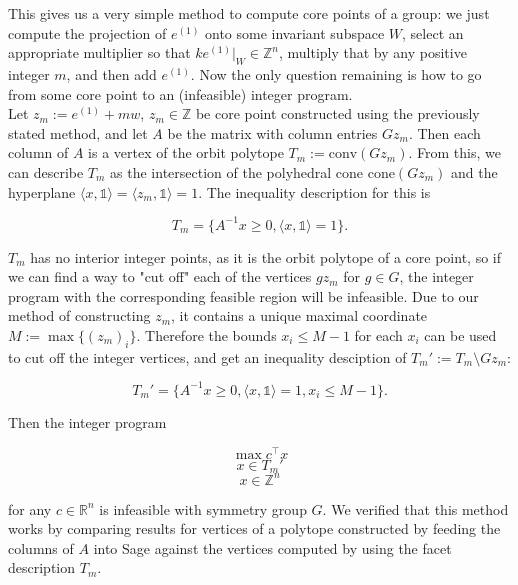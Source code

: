 \documentclass[11pt]{article} %
\theoremstyle{definition}
\theoremstyle{remark}
\newcommand{\ZZ}{\mathbb{Z}}
\newcommand{\RR}{\mathbb{R}}
\begin{document}
This gives us a very simple method to compute core points of a group: we just compute the projection of $e^{(1)}$ onto some invariant subspace $W$, select an appropriate multiplier so that $ke^{(1)}|_W \in \ZZ^n$, multiply that by any positive integer $m$, and then add $e^{(1)}$. Now the only question remaining is how to go from some core point to an (infeasible) integer program.\\

Let $z_m := e^{(1)} + mw$, $z_m \in \ZZ$ be core point constructed using the previously stated method, and let $A$ be the matrix with column entries $Gz_m$. Then each column of $A$ is a vertex of the orbit polytope $T_m := \textrm{conv}(Gz_m)$. From this, we can describe $T_m$ as the intersection of the polyhedral cone $\textrm{cone}(Gz_m)$ and the hyperplane $\langle x,\mathds{1} \rangle = \langle z_m, \mathds{1} \rangle = 1$. The inequality description for this is

\[ T_m = \lbrace A^{-1}x \geq 0, \langle x,\mathds{1} \rangle = 1 \rbrace .\]

$T_m$ has no interior integer points, as it is the orbit polytope of a core point, so if we can find a way to "cut off" each of the vertices $gz_m$ for $g \in G$, the integer program with the corresponding feasible region will be infeasible. Due to our method of constructing $z_m$, it contains a unique maximal coordinate $M := \max \lbrace {(z_m)_i} \rbrace$. Therefore the bounds $x_i \leq M-1$ for each $x_i$ can be used to cut off the integer vertices, and get an inequality desciption of $T_m' := T_m \setminus Gz_m$:

\[ T_m' = \lbrace A^{-1}x \geq 0, \langle x,\mathds{1} \rangle = 1, x_i \leq M-1 \rbrace .\]

Then the integer program 

\[ \max c^\intercal x \] \[ x \in T_m' \] \[ x \in \ZZ^n \]

for any $c \in \RR^n$ is infeasible with symmetry group $G$. We verified that this method works by comparing results for vertices of a polytope constructed by feeding the columns of $A$ into Sage against the vertices computed by using the facet description $T_m$.
\end{document}
